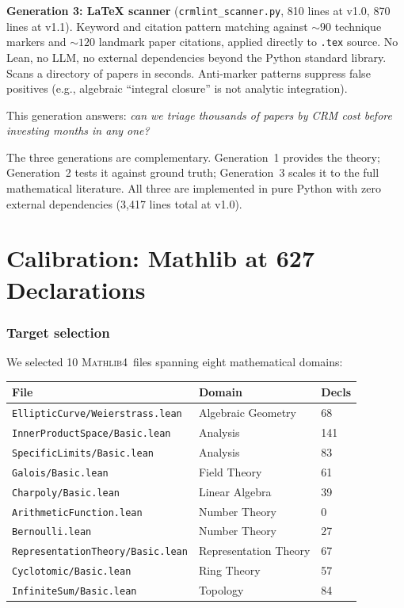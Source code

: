 \documentclass[11pt,a4paper]{article}
\theoremstyle{plain}
\theoremstyle{definition}
\newcommand{\Mathlib}{\textsc{Mathlib4}}
\begin{document}
\medskip
\noindent\textbf{Generation 3: LaTeX scanner}
(\texttt{crmlint\_scanner.py}, 810 lines at v1.0, 870 lines at v1.1).
Keyword and citation pattern matching against ${\sim}90$ technique
markers and ${\sim}120$ landmark paper citations, applied directly to
\texttt{.tex} source.  No Lean, no LLM, no external dependencies
beyond the Python standard library.  Scans a directory of papers in
seconds.  Anti-marker patterns suppress false positives (e.g.,
algebraic ``integral closure'' is not analytic integration).

This generation answers: \emph{can we triage thousands of papers by
CRM cost before investing months in any one?}

\medskip

The three generations are complementary.  Generation~1 provides the
theory; Generation~2 tests it against ground truth; Generation~3
scales it to the full mathematical literature.  All three are
implemented in pure Python with zero external dependencies (3{,}417
lines total at v1.0).


\part{Calibration: Mathlib at 627 Declarations}\label{part:mathlib}

\section{Target selection}\label{sec:target-selection}

We selected 10 \Mathlib\ files spanning eight mathematical domains:

\begin{center}
\small
\begin{tabular}{lll}
\toprule
\textbf{File} & \textbf{Domain} & \textbf{Decls} \\
\midrule
\texttt{EllipticCurve/Weierstrass.lean} & Algebraic Geometry & 68 \\
\texttt{InnerProductSpace/Basic.lean} & Analysis & 141 \\
\texttt{SpecificLimits/Basic.lean} & Analysis & 83 \\
\texttt{Galois/Basic.lean} & Field Theory & 61 \\
\texttt{Charpoly/Basic.lean} & Linear Algebra & 39 \\
\texttt{ArithmeticFunction.lean} & Number Theory & 0 \\
\texttt{Bernoulli.lean} & Number Theory & 27 \\
\texttt{RepresentationTheory/Basic.lean} & Representation Theory & 67 \\
\texttt{Cyclotomic/Basic.lean} & Ring Theory & 57 \\
\texttt{InfiniteSum/Basic.lean} & Topology & 84 \\
\bottomrule
\end{tabular}
\end{center}
\end{document}
